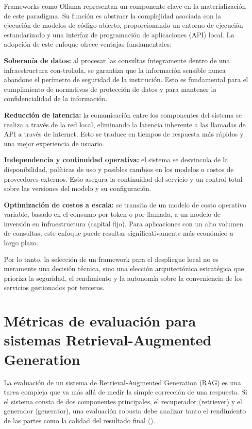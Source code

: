 {{Frameworks como Ollama representan un componente clave en la materialización de este paradigma. Su función es abstraer la complejidad asociada con la ejecución de modelos de código abierto, proporcionando un entorno de ejecución estandarizado y una interfaz de programación de aplicaciones (API) local. La adopción de este enfoque ofrece ventajas fundamentales:

\begin{listaenumerada}
\item \textbf{Soberanía de datos:} al procesar las consultas íntegramente dentro de una infraestructura con-trolada, se garantiza que la información sensible nunca abandone el perímetro de seguridad de la institución. Esto es fundamental para el cumplimiento de normativas de protección de datos y para mantener la confidencialidad de la información.
\item \textbf{Reducción de latencia:} la comunicación entre los componentes del sistema se realiza a través de la red local, eliminando la latencia inherente a las llamadas de API a través de internet. Esto se traduce en tiempos de respuesta más rápidos y una mejor experiencia de usuario.
\item \textbf{Independencia y continuidad operativa:} el sistema se desvincula de la disponibilidad, políticas de uso y posibles cambios en los modelos o costos de proveedores externos. Esto asegura la continuidad del servicio y un control total sobre las versiones del modelo y su configuración.
\item \textbf{Optimización de costos a escala:} se transita de un modelo de costo operativo variable, basado en el consumo por token o por llamada, a un modelo de inversión en infraestructura (capital fijo). Para aplicaciones con un alto volumen de consultas, este enfoque puede resultar significativamente más económico a largo plazo.
\end{listaenumerada}

Por lo tanto, la selección de un framework para el despliegue local no es meramente una decisión técnica, sino una elección arquitectónica estratégica que prioriza la seguridad, el rendimiento y la autonomía sobre la conveniencia de los servicios gestionados por terceros.

\section{Métricas de evaluación para sistemas Retrieval-Augmented Generation}
La evaluación de un sistema de Retrieval-Augmented Generation (RAG) es una tarea compleja que va más allá de medir la simple corrección de una respuesta. Si el sistema consta de dos componentes principales, el recuperador (retriever) y el generador (generator), una evaluación robusta debe analizar tanto el rendimiento de las partes como la calidad del resultado final (\cite{es2023ragas}). 

}}
